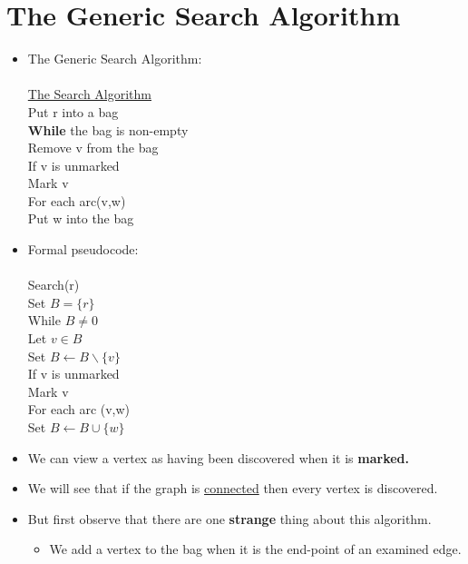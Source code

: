 \documentclass[12pt]{article}
\newcommand{\forceindent}{\leavevmode{\parindent=1em\indent}}
\begin{document}
\section{The Generic Search Algorithm}
\renewcommand{\labelitemii}{$\circ$}
\renewcommand{\labelitemiii}{$\cdot$}
\renewcommand{\labelitemiii}{$\rightarrow$}
\renewcommand{\labelitemiv}{$\star$}
\begin{itemize}
\item The Generic Search Algorithm:\\
\\
\underline{The Search Algorithm}\\
Put r into a bag\\
\forceindent \textbf{While} the bag is non-empty\\
\forceindent \forceindent Remove v from the bag\\
\forceindent \forceindent If v is unmarked \\
\forceindent \forceindent \forceindent Mark v\\
\forceindent \forceindent \forceindent For each arc(v,w)\\
\forceindent \forceindent \forceindent \forceindent Put w into the bag
\item Formal pseudocode:\\
\\
Search(r)\\
Set $B = \{r\}$\\
\forceindent While $B \neq 0$\\
\forceindent \forceindent Let $v \in B$\\
\forceindent \forceindent Set $B \leftarrow B \backslash \{v\}$\\
\forceindent \forceindent If v is unmarked\\
\forceindent \forceindent \forceindent Mark v\\
\forceindent \forceindent \forceindent For each arc (v,w)\\
\forceindent \forceindent \forceindent \forceindent Set $B \leftarrow B \cup \{w\}$
\item We can view a vertex as having been discovered when it is \textbf{marked.}
\item We will see that if the graph is \underline{connected} then every vertex is discovered.
\item But first observe that there are one \textbf{strange} thing about this algorithm.
	\begin{itemize}
	\item We add a vertex to the bag when it is the end-point of an examined edge.

\end{itemize}
\end{itemize}
\end{document}
